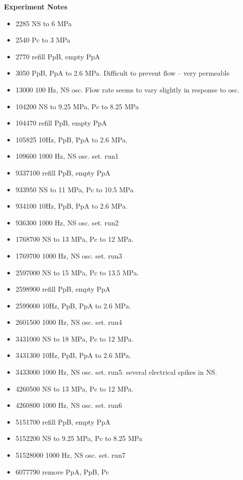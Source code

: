 \documentclass[letterpaper, 10pt]{article}
\begin{document}
\newpage 
 \textbf{Experiment Notes}
 \medskip
 {\small \begin{itemize}[label=\#]
 \setlength\itemsep{0.25em}
 	 \item 2285 NS to 6 MPa
 	 \item 2540 Pc to 3 MPa
 	 \item 2770 refill PpB, empty PpA
 	 \item 3050 PpB, PpA to 2.6 MPa. Difficult to prevent flow -- very permeable
 	 \item 13000 100 Hz, NS osc. Flow rate seems to vary slightly in response to osc.
 	 \item 104200 NS to 9.25 MPa, Pc to 8.25 MPa
 	 \item 104470 refill PpB, empty PpA
 	 \item 105825 10Hz, PpB, PpA to 2.6 MPa.
 	 \item 109600 1000 Hz, NS osc. set. run1
 	 \item 9337100 refill PpB, empty PpA
 	 \item 933950 NS to 11 MPa, Pc to 10.5 MPa
 	 \item 934100 10Hz, PpB, PpA to 2.6 MPa.
 	 \item 936300 1000 Hz, NS osc. set. run2
 	 \item 1768700 NS to 13 MPa, Pc to 12 MPa. 
 	 \item 1769700 1000 Hz, NS osc. set. run3
 	 \item 2597000 NS to 15 MPa, Pc to 13.5 MPa. 
 	 \item 2598900 refill PpB, empty PpA
 	 \item 2599000 10Hz, PpB, PpA to 2.6 MPa.
 	 \item 2601500 1000 Hz, NS osc. set. run4
 	 \item 3431000 NS to 18 MPa, Pc to 12 MPa.
 	 \item 3431300 10Hz, PpB, PpA to 2.6 MPa.
 	 \item 3433000 1000 Hz, NS osc. set. run5. several electrical spikes in NS. 
 	 \item 4260500 NS to 13 MPa, Pc to 12 MPa. 
 	 \item 4260800 1000 Hz, NS osc. set. run6
 	 \item 5151700 refill PpB, empty PpA
 	 \item 5152200 NS to 9.25 MPa, Pc to 8.25 MPa
 	 \item 51528000 1000 Hz, NS osc. set. run7
 	 \item 6077790 remove PpA, PpB, Pc

 \end{itemize}} 

 
\end{document}
